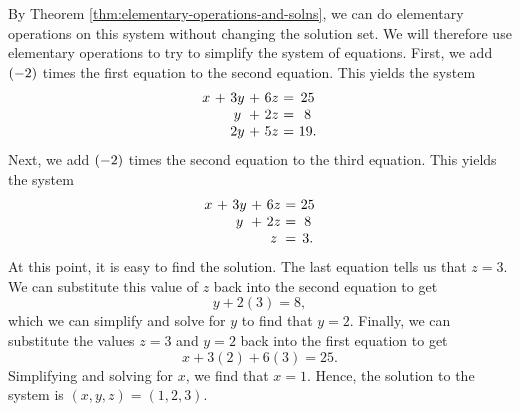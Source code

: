 \begin{solution}
  By Theorem \ref{thm:elementary-operations-and-solns}, we can do
  elementary operations on this system without changing the solution
  set. We will therefore use elementary operations to try to simplify
  the system of equations.  First, we add $\left(-2\right)$ times the
  first equation to the second equation. This yields the system
  \begin{equation*}
    \begin{array}{c@{~}c@{~}c@{~}c@{~}c@{~}c@{~}c}
      x&+&3y&+&6z&=&25 \\
       &&y&+&2z&=&8 \\
       &&2y&+&5z&=&19.
    \end{array}
    \label{solving-a-system2}
  \end{equation*}
  Next, we add $\left(-2\right)$ times the second equation to the
  third equation. This yields the system
  \begin{equation}
    \begin{array}{c@{~}c@{~}c@{~}c@{~}c@{~}c@{~}c}
      x&+&3y&+&6z&=&25 \\
      &&y&+&2z&=&8 \\
      &&&&z&=&3.
    \end{array}
    \label{solving-a-system3}
  \end{equation}
  At this point, it is easy to find the solution. The last equation
  tells us that $z=3$. We can substitute this value of $z$ back into
  the second equation to get
  \begin{equation*}
    y+2(3)=8,
  \end{equation*}
  which we can simplify and solve for $y$ to find that $y=2$. Finally,
  we can substitute the values $z=3$ and $y=2$ back into the first
  equation to get
  \begin{equation*}
    x+3(2)+6(3)=25.
  \end{equation*}
  Simplifying and solving for $x$, we find that $x=1$. Hence, the
  solution to the system is $(x,y,z)=(1,2,3)$.


\end{solution}
